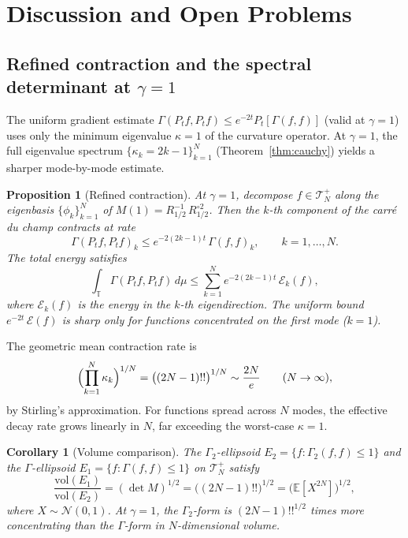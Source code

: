 \documentclass[11pt,a4paper]{article}
\theoremstyle{plain}
\newtheorem{proposition}[theorem]{Proposition}
\newtheorem{corollary}[theorem]{Corollary}
\theoremstyle{definition}
\theoremstyle{remark}
\newcommand{\E}{\mathbb{E}}
\newcommand{\T}{\mathbb{T}}
\begin{document}
\section{Discussion and Open Problems}\label{sec:discussion}

\subsection{Refined contraction and the spectral determinant at $\gamma = 1$}

The uniform gradient estimate
$\Gamma(P_t f, P_t f) \leq e^{-2t}P_t[\Gamma(f,f)]$
(valid at $\gamma = 1$) uses only
the minimum eigenvalue $\kappa = 1$ of the curvature operator.
At $\gamma = 1$, the full eigenvalue spectrum
$\{\kappa_k = 2k-1\}_{k=1}^N$ (Theorem~\ref{thm:cauchy})
yields a sharper mode-by-mode estimate.

\begin{proposition}[Refined contraction]\label{prop:refined}
At $\gamma = 1$, decompose $f \in \mathcal{T}_N^+$ along the
eigenbasis $\{\phi_k\}_{k=1}^N$ of $M(1) = R_{1/2}^{-1}\,R_{1/2}^{\circ 2}$.
Then the $k$-th component of the carr\'e du champ contracts at rate
\begin{equation}\label{eq:refined-contraction}
  \Gamma(P_t f, P_t f)_k \leq e^{-2(2k-1)t}\,\Gamma(f,f)_k,
  \qquad k = 1,\ldots,N.
\end{equation}
The total energy satisfies
\begin{equation}\label{eq:total-energy}
  \int_\T \Gamma(P_t f, P_t f)\,d\mu
  \leq \sum_{k=1}^N e^{-2(2k-1)t}\,\mathcal{E}_k(f),
\end{equation}
where $\mathcal{E}_k(f)$ is the energy in the $k$-th eigendirection.
The uniform bound $e^{-2t}\,\mathcal{E}(f)$ is sharp only for
functions concentrated on the first mode ($k=1$).
\end{proposition}

The geometric mean contraction rate is
\[
  \Bigl(\prod_{k=1}^N \kappa_k\Bigr)^{1/N}
  = \bigl((2N-1)!!\bigr)^{1/N} \sim \frac{2N}{e}
  \qquad (N \to \infty),
\]
by Stirling's approximation.
For functions spread across $N$ modes, the effective decay rate
grows linearly in $N$, far exceeding the worst-case $\kappa = 1$.

\begin{corollary}[Volume comparison]\label{cor:volume}
The $\Gamma_2$-ellipsoid
$E_2 = \{f : \Gamma_2(f,f) \leq 1\}$ and the $\Gamma$-ellipsoid
$E_1 = \{f : \Gamma(f,f) \leq 1\}$ on $\mathcal{T}_N^+$ satisfy
\begin{equation}\label{eq:volume-ratio}
  \frac{\mathrm{vol}(E_1)}{\mathrm{vol}(E_2)}
  = (\det M)^{1/2} = \bigl((2N-1)!!\bigr)^{1/2}
  = \bigl(\E[X^{2N}]\bigr)^{1/2},
\end{equation}
where $X \sim \mathcal{N}(0,1)$.
At $\gamma = 1$, the $\Gamma_2$-form is $(2N-1)!!^{1/2}$ times
more concentrating than the $\Gamma$-form in $N$-dimensional volume.
\end{corollary}
\end{document}
